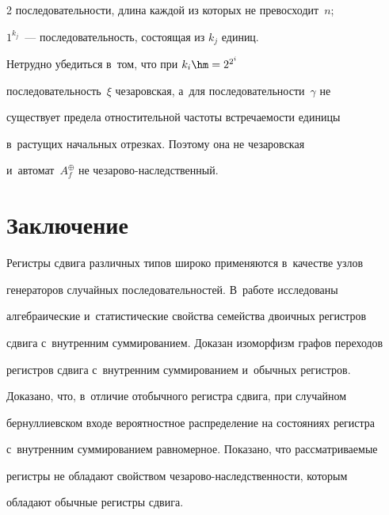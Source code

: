 \begin{multicols}{2}
последовательности, длина каждой из которых не превосходит~$n$; 


$1^{k_j}$~--- последовательность, состоящая из $k_j$ единиц.


  


  Нетрудно убедиться в~том, что при $k_i\hm= 2^{2^i}$ 


последовательность~$\xi$ чезаровская, а~для последовательности~$\gamma$ не 


существует предела отностительной частоты встречаемости единицы 


в~растущих начальных отрезках. Поэтому она не чезаровская 


и~автомат~$A_f^{\oplus}$ не че\-за\-ро\-во-на\-след\-ст\-вен\-ный.


  


\section{Заключение}





  Регистры сдвига различных типов широко применяются в~качестве узлов 


генераторов случайных последовательностей. В~работе исследованы 


алгебраические и~статистические свойства семейства двоичных регистров 


сдвига с~внутренним суммированием. Доказан изоморфизм графов переходов 


регистров сдвига с~внутренним суммированием и~обычных регистров. 


Доказано, что, в~отличие от\linebreak обычного регистра сдвига, при случайном 


бернуллиевском входе вероятностное распределение на состояниях регистра 


с~внутренним суммированием равномерное. Показано, что рассматриваемые 


регистры не обладают свойством че\-за\-ро\-во-на\-след\-ст\-вен\-ности, которым 


обладают обычные регистры сдвига. 


  


{\small\frenchspacing


 {%




}}
\end{multicols}
